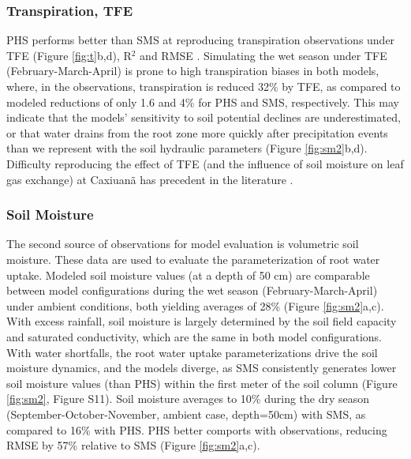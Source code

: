 \documentclass[draft,linenumbers]{agujournal}
\begin{document}
\subsubsection{Transpiration, TFE}
\label{sect:ttfe}
PHS performs better than SMS at reproducing transpiration observations under TFE (Figure \ref{fig:t}b,d),  R$^2$  and  RMSE .
Simulating the wet season under TFE (February-March-April) is prone to high transpiration biases in both models, where, in the observations, transpiration is reduced 32\% by TFE, as compared to modeled reductions of only 1.6 and 4\% for PHS and SMS, respectively.
This may indicate that the models' sensitivity to soil potential declines are underestimated, or that water drains from the root zone more quickly after precipitation events than we represent with the soil hydraulic parameters (Figure \ref{fig:sm2}b,d).
Difficulty reproducing the effect of TFE (and the influence of soil moisture on leaf gas exchange) at Caxiuan\~a has precedent in the literature \citep{restrepo2017,powell2013}.

\subsubsection{Soil Moisture}
\label{results:sm}
The second source of observations for model evaluation is volumetric soil moisture. 
These data are used to evaluate the parameterization of root water uptake.
Modeled soil moisture values (at a depth of 50 cm) are comparable between model configurations during the wet season (February-March-April) under ambient conditions, both yielding averages of 28\% (Figure \ref{fig:sm2}a,c).
With excess rainfall, soil moisture is largely determined by the soil field capacity and saturated conductivity, which are the same in both model configurations.
With water shortfalls, the root water uptake parameterizations drive the soil moisture dynamics, and the models diverge, 
as SMS consistently generates lower soil moisture values (than PHS) within the first meter of the soil column (Figure \ref{fig:sm2}, Figure S11).
Soil moisture averages to 10\% during the dry season (September-October-November, ambient case, depth=50cm) with SMS, as compared to 16\% with PHS.
PHS better comports with observations, reducing RMSE by 57\% relative to SMS (Figure \ref{fig:sm2}a,c).
\end{document}
